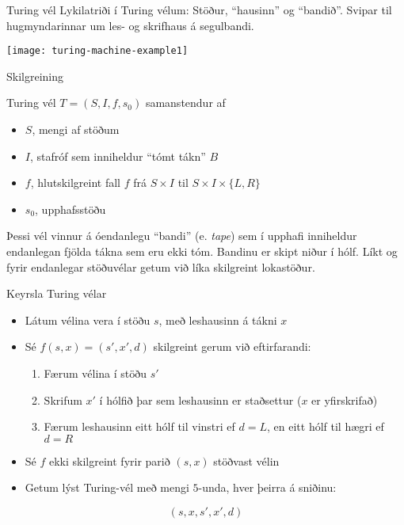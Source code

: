 \documentclass[handout]{beamer}
\begin{document}
\begin{frame}{Turing vél}
Lykilatriði í Turing vélum: Stöður, ``hausinn'' og ``bandið''. Svipar til hugmyndarinnar um les- og skrifhaus á segulbandi.
\begin{center}
\texttt{[image: turing-machine-example1]}
\end{center}
\end{frame}

\begin{frame}{Skilgreining}
\begin{tcolorbox}[title=Turing vél]
Turing vél $T = (S, I, f, s_0)$ samanstendur af
\begin{itemize}
 \item $S$, mengi af stöðum
 \item $I$, stafróf sem inniheldur ``tómt tákn'' $B$
 \item $f$, hlutskilgreint fall $f$ frá $S \times I$ til $S \times I \times \{L, R\}$
 \item $s_0$, upphafsstöðu
\end{itemize}
\end{tcolorbox}
Þessi vél vinnur á óendanlegu ``bandi'' (e. \emph{tape}) sem í upphafi inniheldur endanlegan fjölda tákna sem eru ekki tóm. Bandinu er skipt niður í hólf. Líkt og fyrir endanlegar stöðuvélar getum við líka skilgreint lokastöður.
\end{frame}

\begin{frame}{Keyrsla Turing vélar}
\begin{itemize}
 \item Látum vélina vera í stöðu $s$, með leshausinn á tákni $x$
 \item Sé $f(s,x) = (s',x',d)$ skilgreint gerum við eftirfarandi:
 \begin{enumerate}
  \item Færum vélina í stöðu $s'$
  \item Skrifum $x'$ í hólfið þar sem leshausinn er staðsettur ($x$ er yfirskrifað)
  \item Færum leshausinn eitt hólf til vinstri ef $d = L$, en eitt hólf til hægri ef $d = R$
 \end{enumerate}
 \item Sé $f$ ekki skilgreint fyrir parið $(s,x)$ stöðvast vélin
 \item Getum lýst Turing-vél með mengi $5$-unda, hver þeirra á sniðinu:
\end{itemize}
\[(s, x, s' , x' , d)\]
\end{frame}
\end{document}

